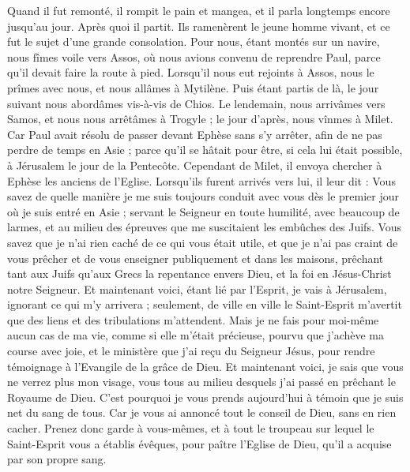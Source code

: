 \begin{multicols}{2}
Quand il fut remonté, il rompit le pain et mangea, et il parla longtemps encore jusqu'au jour. Après quoi il partit.
Ils ramenèrent le jeune homme vivant, et ce fut le sujet d'une grande consolation.
Pour nous, étant montés sur un navire, nous fîmes voile vers Assos, où nous avions convenu de reprendre Paul, parce qu'il devait faire la route à pied.
Lorsqu'il nous eut rejoints à Assos, nous le prîmes avec nous, et nous allâmes à Mytilène.
Puis étant partis de là, le jour suivant nous abordâmes vis-à-vis de Chios. Le lendemain, nous arrivâmes vers Samos, et nous nous arrêtâmes à Trogyle ; le jour d'après, nous vînmes à Milet.
Car Paul avait résolu de passer devant Ephèse sans s'y arrêter, afin de ne pas perdre de temps en Asie ; parce qu'il se hâtait pour être, si cela lui était possible, à Jérusalem le jour de la Pentecôte.
Cependant de Milet, il envoya chercher à Ephèse les anciens de l'Eglise.
Lorsqu'ils furent arrivés vers lui, il leur dit : Vous savez de quelle manière je me suis toujours conduit avec vous dès le premier jour où je suis entré en Asie ;
servant le Seigneur en toute humilité, avec beaucoup de larmes, et au milieu des épreuves que me suscitaient les embûches des Juifs.
Vous savez que je n'ai rien caché de ce qui vous était utile, et que je n'ai pas craint de vous prêcher et de vous enseigner publiquement et dans les maisons,
prêchant tant aux Juifs qu'aux Grecs la repentance envers Dieu, et la foi en Jésus-Christ notre Seigneur.
Et maintenant voici, étant lié par l'Esprit, je vais à Jérusalem, ignorant ce qui m'y arrivera ;
seulement, de ville en ville le Saint-Esprit m'avertit que des liens et des tribulations m'attendent.
Mais je ne fais pour moi-même aucun cas de ma vie, comme si elle m'était précieuse, pourvu que j'achève ma course avec joie, et le ministère que j'ai reçu du Seigneur Jésus, pour rendre témoignage à l'Evangile de la grâce de Dieu.
Et maintenant voici, je sais que vous ne verrez plus mon visage, vous tous au milieu desquels j'ai passé en prêchant le Royaume de Dieu.
C'est pourquoi je vous prends aujourd'hui à témoin que je suis net du sang de tous.
Car je vous ai annoncé tout le conseil de Dieu, sans en rien cacher.
Prenez donc garde à vous-mêmes, et à tout le troupeau sur lequel le Saint-Esprit vous a établis évêques, pour paître l'Eglise de Dieu, qu'il a acquise par son propre sang.

\end{multicols}
